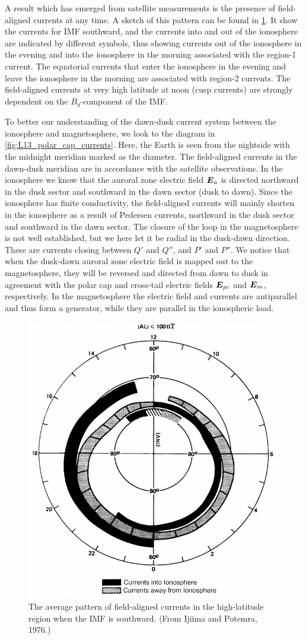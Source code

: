 A result which has emerged from satellite measurements is the presence of field-aligned currents at any time. A sketch of this pattern can be found in \cref{fig:L13_field_aligned_currents}. It show the currents for IMF southward, and the currents into and out of the ionosphere are indicated by different symbols, thus showing currents out of the ionosphere in the evening and into the ionosphere in the morning associated with the region-1 current. The equatorial currents that enter the ionosphere in the evening and leave the ionosphere in the morning are associated with region-2 currents. The field-aligned currents at very high latitude at noon (cusp currents) are strongly dependent on the \(B_y\)-component of the IMF\@.

To better our understanding of the dawn-dusk current system between the ionosphere and magnetosphere, we look to the diagram in \cref{fig:L13_polar_cap_currents}. Here, the Earth is seen from the nightside with the midnight meridian marked as the diameter. The field-aligned currents in the dawn-dusk meridian are in accordance with the satellite observations. In the ionosphere we know that the auroral zone electric field \(\boldsymbol{E}_a\) is directed northward in the dusk sector and southward in the dawn sector (dusk to dawn). Since the ionosphere has finite conductivity, the field-aligned currents will mainly shorten in the ionosphere as a result of Pedersen currents, northward in the dusk sector and southward in the dawn sector. The closure of the loop in the magnetosphere is not well established, but we here let it be radial in the dusk-dawn direction. These are currents closing between \(Q'\) and \(Q''\), and \(P'\) and \(P''\). We notice that when the dusk-dawn auroral zone electric field is mapped out to the magnetosphere, they will be reversed and directed from dawn to dusk in agreement with the polar cap and cross-tail electric fields \(\boldsymbol{E}_{pc}\) and \(\boldsymbol{E}_m\), respectively. In the magnetosphere the electric field and currents are antiparallel and thus form a generator, while they are parallel in the ionospheric load.
\begin{figure}[t]
    \centering
    \includegraphics[width=.6\linewidth]{bilder/L13_field_aligned_currents.png}
    \caption{The average pattern of field-aligned currents in the high-latitude region when the IMF is southward. (From Ijiima and Potemra, 1976.)}\label{fig:L13_field_aligned_currents}
\end{figure}
